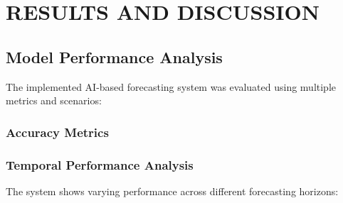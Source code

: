 \documentclass[12pt,a4paper]{report}
\begin{document}
\chapter{RESULTS AND DISCUSSION}
\section{Model Performance Analysis}
The implemented AI-based forecasting system was evaluated using multiple metrics and scenarios:

\subsection{Accuracy Metrics}
\begin{table}[htbp]
\caption{Performance Comparison of Different Models}
\vspace{0.5cm}
\end{table}

\subsection{Temporal Performance Analysis}
The system shows varying performance across different forecasting horizons:
\end{document}
